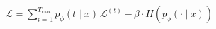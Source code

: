 \documentclass[preview]{standalone}
\begin{document}
\begin{align*}
\mathcal{L} = \sum_{t=1}^{T_{\max}} p_\phi(t \mid x)\,\mathcal{L}^{(t)} - \beta \cdot H\!\left(p_\phi(\cdot \mid x)\right)
\end{align*}
\end{document}
